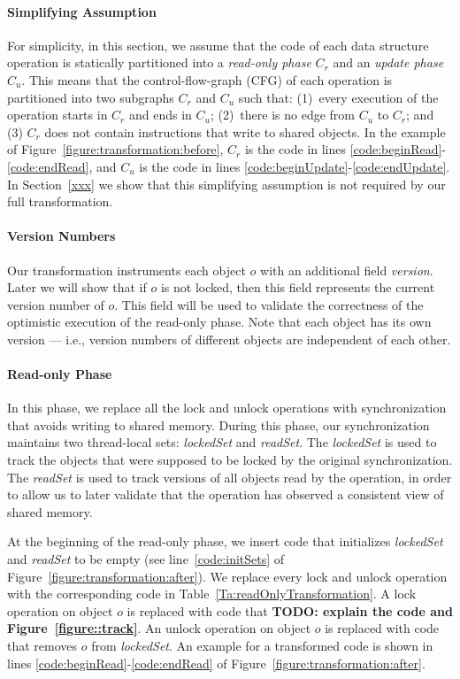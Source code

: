 \paragraph{Simplifying Assumption}
For simplicity, in this section, we assume that the code of each data structure operation is statically partitioned into a \emph{read-only phase} $C_r$ and an \emph{update phase} $C_u$.
This means that the control-flow-graph (CFG) of each operation is partitioned into two subgraphs $C_r$ and $C_u$ such that:
(1)~every execution of the operation starts in $C_r$ and ends in $C_u$; (2)~there is no edge from $C_u$ to  $C_r$;
and (3) $C_r$ does not contain instructions that write to shared objects.
%
In the example of Figure~\ref{figure:transformation:before}, $C_r$ is the code in lines \ref{code:beginRead}-\ref{code:endRead},
and $C_u$ is the code in lines \ref{code:beginUpdate}-\ref{code:endUpdate}.
%
In Section~\ref{xxx} we show that this simplifying assumption is not required by our full transformation.

\paragraph{Version Numbers}
Our transformation instruments each object $o$ with an additional field \emph{version}.
Later we will show that if $o$ is not locked, then this field  represents the current version number of $o$.
This field will be used to validate the correctness of the optimistic execution of the read-only phase.
Note that each object has its own version --- i.e., version numbers of different objects are independent of each other.

\paragraph{Read-only Phase}
In this phase, we replace all the lock and unlock operations with synchronization that avoids writing to shared memory.
During this phase, our synchronization maintains two thread-local sets: \emph{lockedSet} and \emph{readSet}.
The \emph{lockedSet} is used to track the objects that were supposed to be locked by the original synchronization.
The \emph{readSet} is used to track versions of all objects read by the
operation, in order to allow us to later validate that the operation has observed a consistent view of shared memory.

At the beginning of the read-only phase, we insert code that initializes \emph{lockedSet} and \emph{readSet} to be empty (see  line~\ref{code:initSets} of Figure~\ref{figure:transformation:after}).
We replace every lock and unlock operation with the corresponding code in Table~\ref{Ta:readOnlyTransformation}.
A lock operation on object $o$ is replaced with code that \textbf{TODO: explain the code and Figure~\ref{figure::track}}.
An unlock operation on object $o$ is replaced with code that removes $o$ from \emph{lockedSet}.
An example for a transformed code is shown in lines \ref{code:beginRead}-\ref{code:endRead} of Figure~\ref{figure:transformation:after}.

